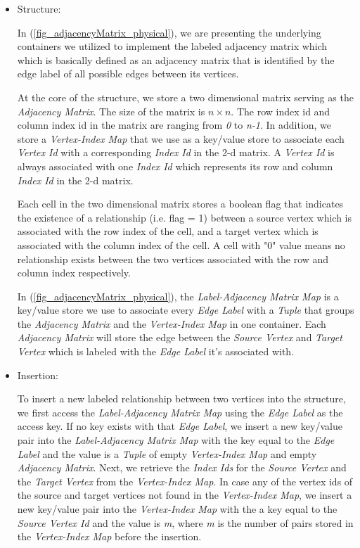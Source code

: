 {\begin{itemize}
\item{Structure:}

In (\ref{fig_adjacencyMatrix_physical}), we are presenting the underlying containers we utilized to implement the labeled adjacency matrix which which is basically defined as an adjacency matrix that is identified by the edge label of all possible edges between its vertices.

At the core of the structure, we store a two dimensional matrix serving as the \textit{Adjacency Matrix}. The size of the matrix is \textit{$n \times n$}. The row index id and column index id in the matrix are ranging from \textit{0} to \textit{n-1}. In addition, we store a \textit{Vertex-Index Map} that we use as a key/value store to associate each \textit{Vertex Id} with a corresponding \textit{Index Id} in the 2-d matrix. A \textit{Vertex Id} is always associated with one \textit{Index Id} which represents its row and column \textit{Index Id} in the 2-d matrix.

Each cell in the two dimensional matrix stores a boolean flag that indicates the existence of a relationship (i.e. flag = 1) between a source vertex which is associated with the row index of the cell, and a target vertex which is associated with the column index of the cell. A cell with "0" value means no relationship exists between the two vertices associated with the row and column index respectively.


In (\ref{fig_adjacencyMatrix_physical}), the \textit{Label-Adjacency Matrix Map} is a key/value store we use to associate every \textit{Edge Label} with a \textit{Tuple} that groups the \textit{Adjacency Matrix} and the \textit{Vertex-Index Map} in one container. Each \textit{Adjacency Matrix} will store the edge between the \textit{Source Vertex} and \textit{Target Vertex} which is labeled with the \textit{Edge Label} it's associated with.

\item{Insertion:}

To insert a new labeled relationship between two vertices into the structure, we first access the \textit{Label-Adjacency Matrix Map} using the \textit{Edge Label} as the access key. If no key exists with that \textit{Edge Label}, we insert a new key/value pair into the \textit{Label-Adjacency Matrix Map} with the key equal to the \textit{Edge Label} and the value is a \textit{Tuple} of empty \textit{Vertex-Index Map} and empty \textit{Adjacency Matrix}. Next, we retrieve the \textit{Index Ids} for the \textit{Source Vertex} and the \textit{Target Vertex} from the \textit{Vertex-Index Map}. In case any of the vertex ids of the source and target vertices not found in the \textit{Vertex-Index Map}, we insert a new key/value pair into the \textit{Vertex-Index Map} with the a key equal to the \textit{Source Vertex Id} and the value is \textit{m}, where \textit{m} is the number of pairs stored in the \textit{Vertex-Index Map} before the insertion. 


\end{itemize}}
